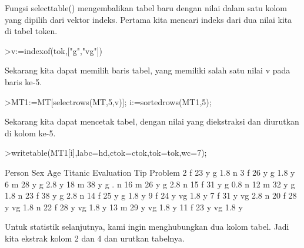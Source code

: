 \documentclass[a4paper,10pt]{article}
\begin{document}
\begin{eulernotebook}
\begin{eulercomment}
\begin{eulercomment}
\begin{eulercomment}
Fungsi selecttable() mengembalikan tabel baru dengan nilai dalam satu
kolom yang dipilih dari vektor indeks. Pertama kita mencari indeks
dari dua nilai kita di tabel token.
\end{eulercomment}
\begin{eulerprompt}
>v:=indexof(tok,["g","vg"])
\end{eulerprompt}
\begin{euleroutput}
  [5,  6]
\end{euleroutput}
\begin{eulercomment}
Sekarang kita dapat memilih baris tabel, yang memiliki salah satu
nilai v pada baris ke-5.
\end{eulercomment}
\begin{eulerprompt}
>MT1:=MT[selectrows(MT,5,v)]; i:=sortedrows(MT1,5);
\end{eulerprompt}
\begin{eulercomment}
Sekarang kita dapat mencetak tabel, dengan nilai yang diekstraksi dan
diurutkan di kolom ke-5.
\end{eulercomment}
\begin{eulerprompt}
>writetable(MT1[i],labc=hd,ctok=ctok,tok=tok,wc=7);
\end{eulerprompt}
\begin{euleroutput}
   Person    Sex    Age Titanic Evaluation    Tip Problem
        2      f     23       y          g    1.8       n
        3      f     26       y          g    1.8       y
        6      m     28       y          g    2.8       y
       18      m     38       y          g      .       n
       16      m     26       y          g    2.8       n
       15      f     31       y          g    0.8       n
       12      m     32       y          g    1.8       n
       23      f     38       y          g    2.8       n
       14      f     25       y          g    1.8       y
        9      f     24       y         vg    1.8       y
        7      f     31       y         vg    2.8       n
       20      f     28       y         vg    1.8       n
       22      f     28       y         vg    1.8       y
       13      m     29       y         vg    1.8       y
       11      f     23       y         vg    1.8       y
\end{euleroutput}
\begin{eulercomment}
Untuk statistik selanjutnya, kami ingin menghubungkan dua kolom tabel.
Jadi kita ekstrak kolom 2 dan 4 dan urutkan tabelnya.
\end{eulercomment}
\begin{eulerprompt}

\end{eulerprompt}
\end{eulercomment}
\end{eulercomment}
\end{eulernotebook}
\end{document}
